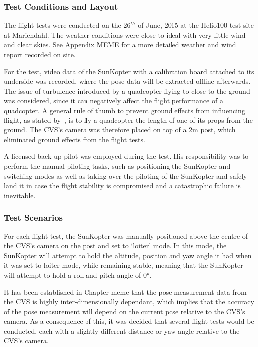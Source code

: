 \subsubsection{Test Conditions and Layout}

The flight tests were conducted on the 26$^{th}$ of June, 2015 at the Helio100 test site at Mariendahl. The weather conditions were close to ideal with very little wind and clear skies. See Appendix MEME for a more detailed weather and wind report recorded on site.

For the test, video data of the SunKopter with a calibration board attached to its underside was recorded, where the pose data will be extracted offline afterwards. The issue of turbulence introduced by a quadcopter flying to close to the ground was considered, since it can negatively affect the flight performance of a quadcopter. A general rule of thumb to prevent ground effects from influencing flight, as stated by~\cite{basson-flight-test}, is to fly a quadcopter the length of one of its props from the ground. The CVS's camera was therefore placed on top of a 2m post, which eliminated ground effects from the flight tests.

A licensed back-up pilot was employed during the test. His responsibility was to perform the manual piloting tasks, such as positioning the SunKopter and switching modes as well as taking over the piloting of the SunKopter and safely land it in case the flight stability is compromised and a catastrophic failure is inevitable.

\subsubsection{Test Scenarios}

For each flight test, the SunKopter was manually positioned above the centre of the CVS's camera on the post and set to `loiter' mode. In this mode, the SunKopter will attempt to hold the altitude, position and yaw angle it had when it was set to loiter mode, while remaining stable, meaning that the SunKopter will attempt to hold a roll and pitch angle of $\ang{0}$. 

It has been established in Chapter meme that the pose measurement data from the CVS is highly inter-dimensionally dependant, which implies that the accuracy of the pose measurement will depend on the current pose relative to the CVS's camera. As a consequence of this, it was decided that several flight tests would be conducted, each with a slightly different distance or yaw angle relative to the CVS's camera. 

